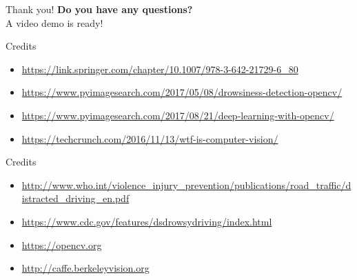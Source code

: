 \documentclass{beamer}
\begin{document}
\begin{frame}{Thank you!}
        \textbf{Do you have any questions?} \\
            \hspace{0.27cm}A video demo is ready!
\end{frame}

\begin{frame}{Credits}
    \begin{itemize}
        \item \url{https://link.springer.com/chapter/10.1007/978-3-642-21729-6_80}
        \item \url{https://www.pyimagesearch.com/2017/05/08/drowsiness-detection-opencv/}
        \item \url{https://www.pyimagesearch.com/2017/08/21/deep-learning-with-opencv/}
        \item \url{https://techcrunch.com/2016/11/13/wtf-is-computer-vision/}
       \end{itemize}
\end{frame}

\begin{frame}{Credits}
    \begin{itemize}
        \item \url{http://www.who.int/violence_injury_prevention/publications/road_traffic/distracted_driving_en.pdf}
        \item \url{https://www.cdc.gov/features/dsdrowsydriving/index.html}
        \item \url{https://opencv.org}
        \item \url{http://caffe.berkeleyvision.org}
    \end{itemize}
\end{frame}
\end{document}
